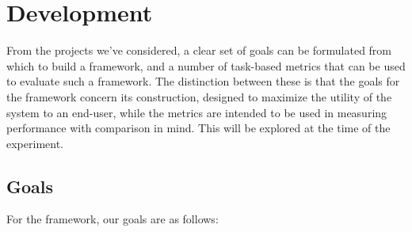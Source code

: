 \documentclass[
hidelinks,
12pt, %
oneside, %
english, %
doublespacing, %
headsepline, %
]{MastersDoctoralThesis} %
\begin{document}
\chapter{Development}
\label{Development}

From the projects we've considered, a clear set of goals can be formulated from which to build a framework, and a number of task-based metrics that can be used to evaluate such a framework. The distinction between these is that the goals for the framework concern its construction, designed to maximize the utility of the system to an end-user, while the metrics are intended to be used in measuring performance with comparison in mind. This will be explored at the time of the experiment.

\section{Goals}

For the framework, our goals are as follows:
\end{document}
